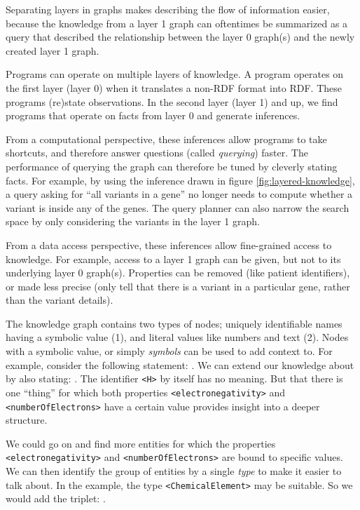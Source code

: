   Separating layers in graphs makes describing the flow of information easier,
  because the knowledge from a layer 1 graph can oftentimes be summarized as a
  query that described the relationship between the layer 0 graph(s) and the
  newly created layer 1 graph.

  Programs can operate on multiple layers of knowledge.  A program operates
  on the first layer (layer 0) when it translates a non-RDF format into RDF.
  These programs (re)state observations.  In the second layer (layer 1) and
  up, we find programs that operate on facts from layer 0 and generate
  inferences.

  From a computational perspective, these inferences allow programs to take
  shortcuts, and therefore answer questions (called \emph{querying}) faster.
  The performance of querying the graph can therefore be tuned by cleverly
  stating facts.  For example, by using the inference drawn in figure
  \ref{fig:layered-knowledge}, a query asking for ``all variants in a gene''
  no longer needs to compute whether a variant is inside any of the
  genes.  The query planner can also narrow the search space by only
  considering the variants in the layer 1 graph.

  From a data access perspective, these inferences allow fine-grained access
  to knowledge.  For example, access to a layer 1 graph can be given, but
  not to its underlying layer 0 graph(s).  Properties can be removed (like
  patient identifiers), or made less precise (only tell that there is a
  variant in a particular gene, rather than the variant details).

  The knowledge graph contains two types of nodes; uniquely identifiable
  names having a symbolic value (1), and literal values like numbers and
  text (2).  Nodes with a symbolic value, or simply \emph{symbols} can be used
  to add context to.  For example, consider the following statement:
  .  We can extend our knowledge
  about  by also stating: .
  The identifier \texttt{<H>} by itself has no meaning.  But that there is one
  ``thing'' for which both properties \texttt{<electronegativity>} and
  \texttt{<numberOfElectrons>} have a certain value provides insight into a
  deeper structure.

  We could go on and find more entities for which the properties
  \texttt{<electronegativity>} and \texttt{<numberOfElectrons>} are bound to
  specific values.  We can then identify the group of entities by a single
  \emph{type} to make it easier to talk about.   In the example, the type
  \texttt{<ChemicalElement>} may be suitable.  So we would add the triplet:
  .

